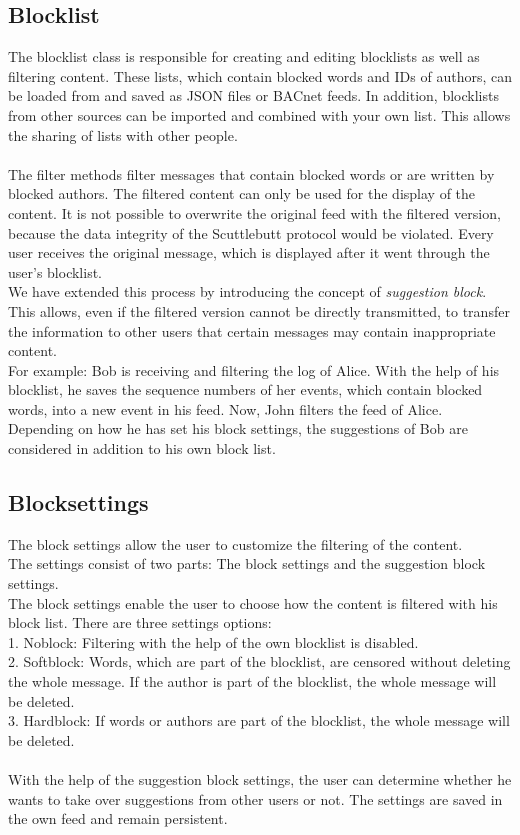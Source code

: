 \documentclass[12pt]{article}
\begin{document}
\subsection{Blocklist}
The blocklist class is responsible for creating and editing blocklists as well as filtering content. 
These lists, which contain blocked words and IDs of authors, can be loaded from and saved as JSON files or BACnet feeds. In addition, blocklists from other sources can be imported and combined with your own list. 
This allows the sharing of lists with other people. \\
\\
The filter methods filter messages that contain blocked words or are written by blocked authors. The filtered content can only be used for the display of the content. It is not possible to overwrite the original feed with the filtered version, because the data integrity of the Scuttlebutt protocol would be violated. Every user receives the original message, which is displayed after it went through the user’s blocklist. \\
We have extended this process by introducing the concept of \textit{suggestion block}. This allows, even if the filtered version cannot be directly transmitted, to transfer the information to other users that certain messages may contain inappropriate content. \\
For example: Bob is receiving and filtering the log of Alice. With the help of his blocklist, he saves the sequence numbers of her events, which contain blocked words, into a new event in his feed. 
Now, John filters the feed of Alice. Depending on how he has set his block settings, the suggestions of Bob are considered in addition to his own block list.

\subsection{Blocksettings}
The block settings allow the user to customize the filtering of the content.\\
The settings consist of two parts: The block settings and the suggestion block settings. \\
The block settings enable the user to choose how the content is filtered with his block list. There are three settings options: \\
1. Noblock: Filtering with the help of the own blocklist is disabled. \\
2. Softblock: Words, which are part of the blocklist, are censored without deleting the whole message. If the author is part of the blocklist, the whole message will be deleted.\\
3. Hardblock: If words or authors are part of the blocklist, the whole message will be deleted.\\
\\
With the help of the suggestion block settings, the user can determine whether he wants to take over suggestions from other users or not. The settings are saved in the own feed and remain persistent.
\end{document}
